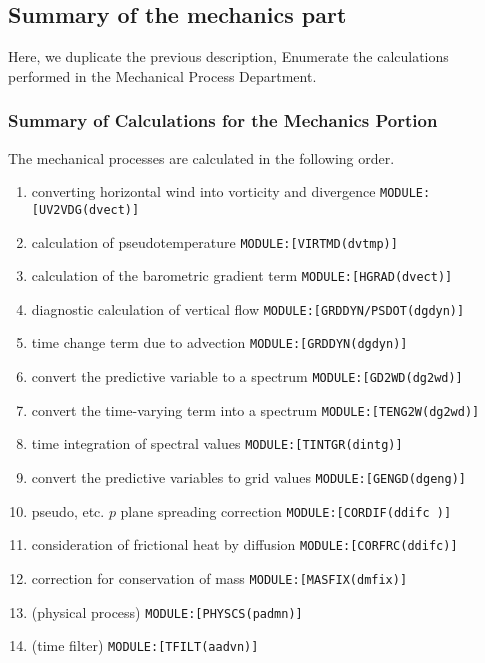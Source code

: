 \hypertarget{summary-of-the-mechanics-part}{%
\subsection{Summary of the mechanics
part}\label{summary-of-the-mechanics-part}}

Here, we duplicate the previous description, Enumerate the calculations
performed in the Mechanical Process Department.

\hypertarget{summary-of-calculations-for-the-mechanics-portion}{%
\subsubsection{Summary of Calculations for the Mechanics
Portion}\label{summary-of-calculations-for-the-mechanics-portion}}

The mechanical processes are calculated in the following order.

\begin{enumerate}
\def\labelenumi{\arabic{enumi}.}
\item
  converting horizontal wind into vorticity and divergence
  \texttt{MODULE:{[}UV2VDG(dvect){]}}
\item
  calculation of pseudotemperature \texttt{MODULE:{[}VIRTMD(dvtmp){]}}
\item
  calculation of the barometric gradient term
  \texttt{MODULE:{[}HGRAD(dvect){]}}
\item
  diagnostic calculation of vertical flow
  \texttt{MODULE:{[}GRDDYN/PSDOT(dgdyn){]}}
\item
  time change term due to advection \texttt{MODULE:{[}GRDDYN(dgdyn){]}}
\item
  convert the predictive variable to a spectrum
  \texttt{MODULE:{[}GD2WD(dg2wd){]}}
\item
  convert the time-varying term into a spectrum
  \texttt{MODULE:{[}TENG2W(dg2wd){]}}
\item
  time integration of spectral values
  \texttt{MODULE:{[}TINTGR(dintg){]}}
\item
  convert the predictive variables to grid values
  \texttt{MODULE:{[}GENGD(dgeng){]}}
\item
  pseudo, etc. \(p\) plane spreading correction
  \texttt{MODULE:{[}CORDIF(ddifc\ ){]}}
\item
  consideration of frictional heat by diffusion
  \texttt{MODULE:{[}CORFRC(ddifc){]}}
\item
  correction for conservation of mass
  \texttt{MODULE:{[}MASFIX(dmfix){]}}
\item
  (physical process) \texttt{MODULE:{[}PHYSCS(padmn){]}}
\item
  (time filter) \texttt{MODULE:{[}TFILT(aadvn){]}}
\end{enumerate}

